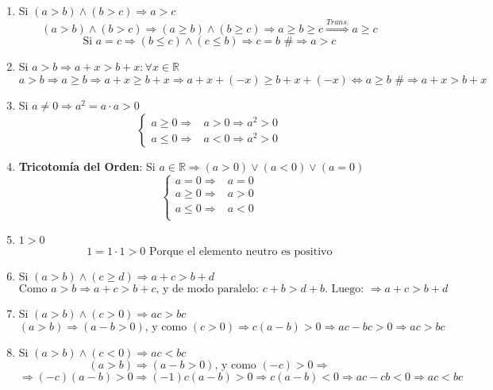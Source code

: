 \documentclass[10pt,a4paper,openright]{book}
\begin{document}
\begin{enumerate}
\item Si $(a>b)\wedge (b>c)\Rightarrow a>c$
$$(a>b)\wedge (b>c)\Rightarrow (a\geq b)\wedge (b\geq c)\Rightarrow a\geq b \geq c\stackrel{Trans.}{\Rightarrow} a\geq c$$
$$\mbox{Si } a=c\Rightarrow (b\leq c) \wedge (c\leq b)\Rightarrow c=b\mbox{ \#}\Rightarrow a>c$$
\vspace{0.5cm}

\item Si $a>b\Rightarrow a+x>b+x: \forall x\in \mathbb R$
$$a>b\Rightarrow a\geq b \Rightarrow a+x\geq b+x \Rightarrow a+x+(-x)\geq b+x+(-x)\Leftrightarrow a\geq b \mbox{ \#}\Rightarrow a+x>b+x$$
\vspace{0.5cm}

\item Si $a\neq 0\Rightarrow a^2=a\cdot a>0$
$$\begin{cases}
a\geq 0 \Rightarrow & a>0\Rightarrow a^2>0 \\
a\leq 0 \Rightarrow & a<0 \Rightarrow a^2>0
\end{cases}$$
\vspace{0.5cm}

\item \textbf{Tricotomía del Orden}: Si $a\in \mathbb R\Rightarrow (a>0)\vee (a<0)\vee (a=0)$
$$\begin{cases}
a=0\Rightarrow & a=0 \\
a\geq 0 \Rightarrow & a>0 \\
a\leq 0 \Rightarrow & a<0 \\
\end{cases}$$
\vspace{0.5cm}

\item $1>0$
$$1=1\cdot 1>0 \mbox{ Porque el elemento neutro es positivo}$$
\vspace{0.5cm}

\item Si $(a>b) \wedge (c\geq d)\Rightarrow a+c>b+d$
$$\mbox{Como } a>b\Rightarrow a+c>b+c\mbox{, y de modo paralelo: } c+b>d+b\mbox{. Luego: }\Rightarrow a+c>b+d$$
\vspace{0.5cm}

\item Si $(a>b) \wedge (c>0)\Rightarrow ac>bc$
$$(a>b)\Rightarrow (a-b>0)\mbox{, y como } (c>0)\Rightarrow c(a-b)>0 \Rightarrow ac-bc>0\Rightarrow ac>bc$$
\vspace{0.5cm}

\item Si $(a>b)\wedge (c<0)\Rightarrow ac<bc$
$$(a>b)\Rightarrow (a-b>0)\mbox{, y como }(-c)>0 \Rightarrow $$
$$\Rightarrow (-c)(a-b)>0 \Rightarrow (-1)c(a-b)>0\Rightarrow c(a-b)<0\Rightarrow ac-cb<0\Rightarrow ac<bc$$
\vspace{0.5cm}


\end{enumerate}
\end{document}
